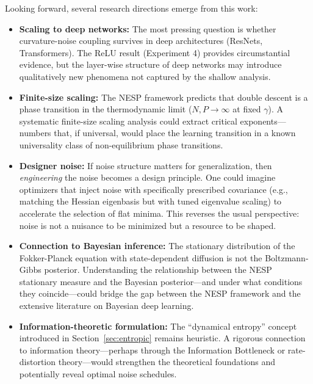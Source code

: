 \documentclass[
  journal=largetwo,
  year=2025,
  volume=37,
]{cup-journal}
\begin{document}
Looking forward, several research directions emerge from this work:

\begin{itemize}
    \item \textbf{Scaling to deep networks:} The most pressing question is whether curvature-noise coupling survives in deep architectures (ResNets, Transformers). The ReLU result (Experiment 4) provides circumstantial evidence, but the layer-wise structure of deep networks may introduce qualitatively new phenomena not captured by the shallow analysis.

    \item \textbf{Finite-size scaling:} The NESP framework predicts that double descent is a phase transition in the thermodynamic limit ($N, P \to \infty$ at fixed $\gamma$). A systematic finite-size scaling analysis could extract critical exponents---numbers that, if universal, would place the learning transition in a known universality class of non-equilibrium phase transitions.

    \item \textbf{Designer noise:} If noise structure matters for generalization, then \textit{engineering} the noise becomes a design principle. One could imagine optimizers that inject noise with specifically prescribed covariance (e.g., matching the Hessian eigenbasis but with tuned eigenvalue scaling) to accelerate the selection of flat minima. This reverses the usual perspective: noise is not a nuisance to be minimized but a resource to be shaped.

    \item \textbf{Connection to Bayesian inference:} The stationary distribution of the Fokker-Planck equation with state-dependent diffusion is not the Boltzmann-Gibbs posterior. Understanding the relationship between the NESP stationary measure and the Bayesian posterior---and under what conditions they coincide---could bridge the gap between the NESP framework and the extensive literature on Bayesian deep learning.

    \item \textbf{Information-theoretic formulation:} The ``dynamical entropy'' concept introduced in Section~\ref{sec:entropic} remains heuristic. A rigorous connection to information theory---perhaps through the Information Bottleneck or rate-distortion theory---would strengthen the theoretical foundations and potentially reveal optimal noise schedules.
\end{itemize}
\end{document}
